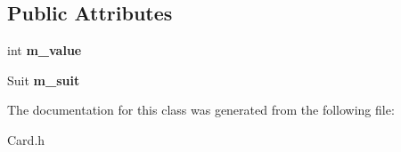 \subsection*{Public Attributes}
\begin{DoxyCompactItemize}
\item 
int {\bfseries m\+\_\+value}\hypertarget{class_card_a232ecb6ad51aa9684917af229a42988e}{}\label{class_card_a232ecb6ad51aa9684917af229a42988e}

\item 
Suit {\bfseries m\+\_\+suit}\hypertarget{class_card_a5eafb96c143a0010ce5ca155182a0b56}{}\label{class_card_a5eafb96c143a0010ce5ca155182a0b56}

\end{DoxyCompactItemize}


The documentation for this class was generated from the following file\+:\begin{DoxyCompactItemize}
\item 
Card.\+h\end{DoxyCompactItemize}
